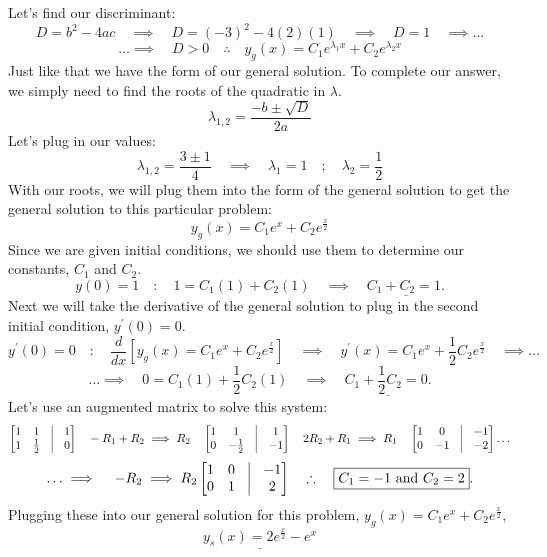 \documentclass[a4paper,12pt]{article} %
\begin{document}
Let's find our discriminant:
$$ D = b^2 - 4ac \quad\implies \quad D = (-3)^2 - 4(2)(1) \quad\implies \quad D = 1\quad\implies \ldots$$
$$\ldots\implies \quad \boxed{D > 0 \quad\therefore\quad y_g(x) = C_1e^{\lambda_1 x} + C_2e^{\lambda_2 x}} $$
Just like that we have the form of our general solution. To complete our answer, we simply need to find the roots of the quadratic in $\lambda$.
$$ \lambda_{1,2} = \frac{-b \pm \sqrt{D}}{2a} $$
Let's plug in our values:
$$ \lambda_{1,2} = \frac{3 \pm 1}{4} \quad\implies\quad \boxed{\lambda_1 = 1 \quad ; \quad \lambda_2 = \frac{1}{2}} $$
With our roots, we will plug them into the form of the general solution to get the general solution to this particular problem:
$$ \boxed{y_g(x) = C_1e^{x} + C_2e^{\frac{x}{2}}} $$
Since we are given initial conditions, we should use them to determine our constants, $C_1$ and $C_2$.
$$y(0)=1 \quad : \quad 1 = C_1(1) + C_2(1) \quad\implies \quad \underline{C_1 + C_2 = 1.}$$
Next we will take the derivative of the general solution to plug in the second initial condition, $y^\prime(0)=0.$
$$ y^\prime(0)=0 \quad : \quad \frac{d}{dx}\left[y_g(x) = C_1e^{x} + C_2e^{\frac{x}{2}}\right] \quad\implies \quad y^\prime(x) = C_1e^x + \frac{1}{2}C_2e^{\frac{x}{2}} \quad \implies \ldots$$
$$ \ldots\implies \quad 0 = C_1(1) + \frac{1}{2}C_2(1) \quad\implies \quad \underline{C_1 + \frac{1}{2}C_2 = 0.} $$
Let's use an augmented matrix to solve this system:
$$\begin{bmatrix}
	1 & 1 & \vline & 1 \\
	1 & \frac{1}{2} & \vline & 0
\end{bmatrix} 
\quad -R_1 + R_2 \implies  R_2 \quad 
\begin{bmatrix}
	1 & 1 & \vline & 1 \\
	0 & -\frac{1}{2} & \vline & -1
\end{bmatrix}
\quad 2R_2 + R_1 \implies  R_1 \quad
\begin{bmatrix}
	1 & 0 & \vline & -1 \\
	0 & -1 & \vline & -2
\end{bmatrix}\ldots
 $$ 
 $$ \ldots\implies \quad -R_2 \implies  R_2 
\begin{bmatrix}
	1 & 0 & \vline & -1 \\
	0 & 1 & \vline & 2
\end{bmatrix} \quad \therefore \quad  \boxed{C_1 = -1 \text{ and } C_2 = 2}.$$
Plugging these into our general solution for this problem, $y_g(x)=C_1 e^x+C_2 e^{\frac{x}{2}}$,
$$ \underline{\boxed{y_s(x) = 2e^{\frac{x}{2}} - e^{x}}} $$
\end{document}

